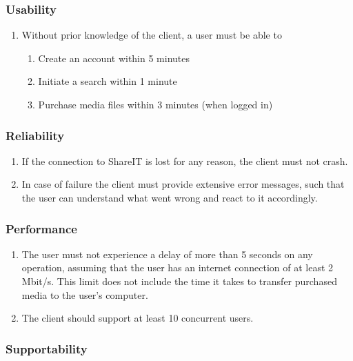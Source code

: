 %

\subsubsection{Usability}

\begin{enumerate}[label=\textbf{NFR-\twodigits*}]
\item Without prior knowledge of the client, a user must be able to
	\begin{enumerate}
	\item Create an account within 5 minutes
	\item Initiate a search within 1 minute
	\item Purchase media files within 3 minutes (when logged in)
	\end{enumerate}
\end{enumerate}

\subsubsection{Reliability}

\begin{enumerate}[label=\textbf{NFR-\twodigits*}, resume]
\item If the connection to ShareIT is lost for any reason, the client must not crash. 
\item In case of failure the client must provide extensive error messages, such that the user can understand what went wrong and react to it accordingly.
\end{enumerate}

\subsubsection{Performance}

\begin{enumerate}[label=\textbf{NFR-\twodigits*}, resume]
\item The user must not experience a delay of more than 5 seconds on any operation, assuming that the user has an internet connection of at least 2 Mbit/s. This limit does not include the time it takes to transfer purchased media to the user's computer.
\item The client should support at least 10 concurrent users. 
\end{enumerate}

\subsubsection{Supportability}


